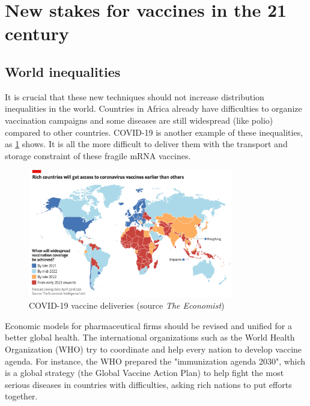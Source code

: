 \documentclass{article}
\begin{document}
    \section{New stakes for vaccines in the 21 century}

        \subsection{World inequalities}

            It is crucial that these new techniques should not increase distribution inequalities in the world.
            Countries in Africa already have difficulties to organize vaccination campaigns and some diseases are still widespread (like polio) compared to other countries.
            COVID-19 is another example of these inequalities, as \ref{fig:world_ineq} shows. It is all the more difficult to deliver them
                with the transport and storage constraint of these fragile mRNA vaccines.
            
                \begin{figure}
                    \centering
                    \includegraphics[width=0.8\textwidth]{imgs/Inequalities.png}
                    \caption{COVID-19 vaccine deliveries (source \emph{The Economist})}
                    \label{fig:world_ineq}
                \end{figure}

            Economic models for pharmaceutical firms should be revised and unified for a better global health.
            The international organizations such as the World Health Organization (WHO) try to coordinate and help every nation to develop vaccine agenda.
            For instance, the WHO prepared the "immunization agenda 2030", which is a global strategy (the Global Vaccine Action Plan) 
                to help fight the most serious diseases in countries with difficulties,
                asking rich nations to put efforts together.
\end{document}
